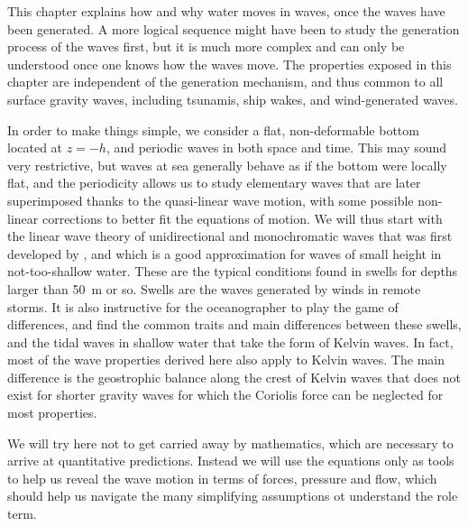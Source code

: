 This chapter explains how and why water moves in waves, once the waves have been generated. 
A more logical sequence might have been to study the generation process of the waves first, but it is much more complex 
and can only be understood once one knows how the waves move. The properties exposed in this chapter
are independent of the generation mechanism, and thus common to all surface gravity waves, including tsunamis, ship wakes, and wind-generated waves. 

In order to make things simple, we consider a flat, non-deformable bottom 
located at $z=-h$, and periodic waves in both space and time. This may sound very restrictive, but waves at 
sea generally behave as if the bottom were locally flat, and the periodicity allows us to study elementary waves 
that are later superimposed thanks to the quasi-linear wave motion, with some possible non-linear corrections to better fit
the equations of motion. We will thus start with the linear wave theory of unidirectional and monochromatic 
waves that was first developed by  \cite{Airy1841}, and which is a good approximation for waves of small height in not-too-shallow water. 
These are the typical conditions found in swells for depths larger than 50~m or so. Swells are the waves generated by winds in remote storms. 
It is also instructive for the oceanographer to play the game of differences, and find the common traits and main differences 
between these swells, and the tidal waves in shallow water that take the form of  Kelvin waves. In fact, most 
of the wave properties derived here also apply to Kelvin waves. The main difference is the geostrophic balance along the crest of Kelvin waves 
that does not exist for shorter gravity waves for which the Coriolis force can be neglected for most properties. 


We will try here not to get carried away by mathematics, which are necessary to arrive at quantitative predictions.
Instead we will use the equations only as tools to help us reveal the wave motion in terms of forces, pressure and flow, which should 
help us navigate the many simplifying assumptions ot understand the role term. 

